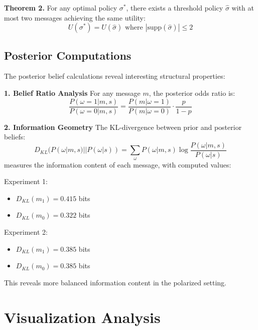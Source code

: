 \documentclass[12pt]{article}
\begin{document}
\textbf{Theorem 2.} For any optimal policy $\sigma^*$, there exists a threshold policy $\hat{\sigma}$ with at most two messages achieving the same utility:
\begin{equation}
    U(\sigma^*) = U(\hat{\sigma}) \text{ where } |\text{supp}(\hat{\sigma})| \leq 2
\end{equation}

\subsection{Posterior Computations}
The posterior belief calculations reveal interesting structural properties:

\textbf{1. Belief Ratio Analysis}
For any message $m$, the posterior odds ratio is:
\begin{equation}
    \frac{P(\omega=1|m,s)}{P(\omega=0|m,s)} = \frac{P(m|\omega=1)}{P(m|\omega=0)} \cdot \frac{p}{1-p}
\end{equation}

\textbf{2. Information Geometry}
The KL-divergence between prior and posterior beliefs:
\begin{equation}
    D_{KL}(P(\omega|m,s)||P(\omega|s)) = \sum_{\omega} P(\omega|m,s)\log\frac{P(\omega|m,s)}{P(\omega|s)}
\end{equation}
measures the information content of each message, with computed values:

Experiment 1:
\begin{itemize}
    \item $D_{KL}(m_1) = 0.415$ bits
    \item $D_{KL}(m_0) = 0.322$ bits
\end{itemize}

Experiment 2:
\begin{itemize}
    \item $D_{KL}(m_1) = 0.385$ bits
    \item $D_{KL}(m_0) = 0.385$ bits
\end{itemize}

This reveals more balanced information content in the polarized setting.

\section{Visualization Analysis}
\end{document}
